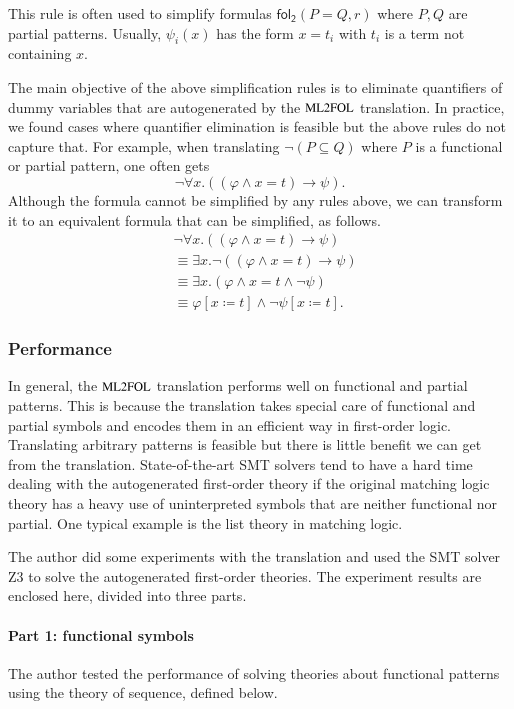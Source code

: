\documentclass{article}
\theoremstyle{plain}
\def\foltwo{\mathsf{fol_2}}
\def\MLFOL{\text{\small ML2FOL}}
\begin{document}
This rule is often used to simplify formulas $\foltwo(P = Q, r)$ where $P, Q$ are partial patterns. Usually, $\psi_i(x)$ has the form $x = t_i$ with $t_i$ is a term not containing $x$.

The main objective of the above simplification rules is to eliminate quantifiers of dummy variables that are autogenerated by the $\MLFOL$ translation. In practice, we found cases where quantifier elimination is feasible but the above rules do not capture that. For example, when translating $\neg (P \subseteq Q)$ where $P$ is a functional or partial pattern, one often gets
$$\neg \forall x . ((\varphi \wedge x = t) \rightarrow \psi).$$
Although the formula cannot be simplified by any rules above, we can transform it to an equivalent formula that can be simplified, as follows.
\begin{align*}
&\neg \forall x . ((\varphi \wedge x = t) \rightarrow \psi) \\
&\equiv \exists x . \neg ((\varphi \wedge x = t) \rightarrow \psi) \\
&\equiv \exists x . (\varphi \wedge x = t \wedge \neg \psi) \\
&\equiv \varphi[x \coloneqq t] \wedge \neg \psi[x \coloneqq t].
\end{align*}

\subsubsection*{Performance}
In general, the $\MLFOL$ translation performs well on functional and partial patterns. This is because the translation takes special care of functional and partial symbols and encodes them in an efficient way in first-order logic. Translating arbitrary patterns is feasible but there is little benefit we can get from the translation. State-of-the-art SMT solvers tend to have a hard time dealing with the autogenerated first-order theory if the original matching logic theory has a heavy use of uninterpreted symbols that are neither functional nor partial. One typical example is the list theory in matching logic.

The author did some experiments with the translation and used the SMT solver Z3 to solve the autogenerated first-order theories. The experiment results are enclosed here, divided into three parts.

\paragraph{Part 1: functional symbols}
The author tested the performance of solving theories about functional patterns using the theory of sequence, defined below.
\end{document}
